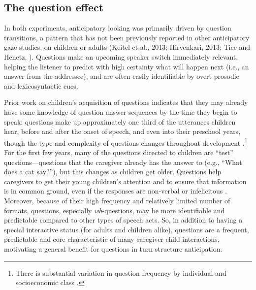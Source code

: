 \documentclass[authoryear, 12pt]{elsarticle}
\begin{document}
\subsection*{The question effect}

In both experiments, anticipatory looking was primarily driven by question transitions, a pattern that has not been previously reported in other anticipatory gaze studies, on children or adults (Keitel et al., 2013; Hirvenkari, 2013; Tice and Henetz, \citeyear{TiceHenetz11}). Questions make an upcoming speaker switch immediately relevant, helping the listener to predict with high certainty what will happen next (i.e., an answer from the addressee), and are often easily identifiable by overt prosodic and lexicosyntactic cues.

Prior work on children's acquisition of questions indicates that they may already have some knowledge of question-answer sequences by the time they begin to speak: questions make up approximately one third of the utterances children hear, before and after the onset of speech, and even into their preschool years, though the type and complexity of questions changes throughout development \citep{casillas2016, fitneva2012, henning2005, shatz1979}.\footnote{There is substantial variation in question frequency by individual and socioeconomic class \citep{hart1992, weisleder2012}.} For the first few years, many of the questions directed to children are ``test'' questions---questions that the caregiver already has the answer to (e.g., ``What does a cat say?''), but this changes as children get older. Questions help caregivers to get their young children's attention and to ensure that information is in common ground, even if the responses are non-verbal or infelicitous \citep{bruner1985, fitneva2012, snow1977}. Moreover, because of their high frequency and relatively limited number of formats, questions, especially \textit{wh}-questions, may be more identifiable and predictable compared to other types of speech acts. So, in addition to having a special interactive status (for adults and children alike), questions are a frequent, predictable and core characteristic of many caregiver-child interactions, motivating a general benefit for questions in turn structure anticipation.
\end{document}
